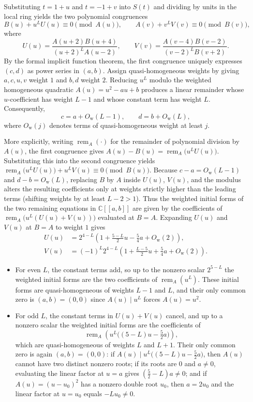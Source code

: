 \documentclass[11pt]{article}
\theoremstyle{definition}
\newcommand{\C}{\mathbb{C}}
\begin{document}
Substituting $t=1+u$ and $t=-1+v$ into $S(t)$ and dividing by units in the local ring yields the
two polynomial congruences
\[
 B(u)+u^L U(u)\equiv 0\pmod{A(u)},\qquad
 A(v)+v^L V(v)\equiv 0\pmod{B(v)},
\]
where
\[
 U(u)=\frac{A(u+2)B(u+4)}{(u+2)^L A(u-2)},\qquad
 V(v)=\frac{A(v-4)B(v-2)}{(v-2)^L B(v+2)}.
\]
By the formal implicit function theorem, the first congruence uniquely expresses $(c,d)$ as power series in $(a,b)$. Assign quasi-homogeneous weights by giving $a,c,u,v$ weight $1$ and $b,d$ weight $2$.
Reducing $u^L$ modulo the weighted homogeneous quadratic $A(u)=u^2-au+b$ produces a linear remainder whose $u$-coefficient has
weight $L-1$ and whose constant term has weight $L$. Consequently,
\[
 c=a+O_{\mathrm{w}}(L-1),\qquad d=b+O_{\mathrm{w}}(L),
\]
where $O_{\mathrm{w}}(j)$ denotes terms of quasi-homogeneous weight at least $j$.

More explicitly, writing $\operatorname{rem}_A(\cdot)$ for the remainder of polynomial division by $A(u)$, the first congruence gives
$A(u)-B(u)=\operatorname{rem}_A\bigl(u^L U(u)\bigr)$. Substituting this into the second congruence yields
$\operatorname{rem}_A\bigl(u^L U(u)\bigr)+u^L V(u)\equiv 0\pmod{B(u)}$. Because $c-a=O_{\mathrm{w}}(L-1)$ and $d-b=O_{\mathrm{w}}(L)$, replacing
$B$ by $A$ inside $U(u)$, $V(u)$, and the modulus alters the resulting coefficients only at weights strictly higher than the leading terms (shifting weights by at least $L-2>1$). Thus the weighted initial forms of the two remaining equations in $\C[[a,b]]$ are given by the coefficients of
$\operatorname{rem}_A\bigl(u^L(U(u)+V(u))\bigr)$ evaluated at $B=A$. Expanding $U(u)$ and $V(u)$ at $B=A$ to weight $1$ gives
\[
 \begin{aligned}
 U(u)&=2^{4-L}\left(1+\frac{5-L}{2}u-\frac{5}{4}a+O_{\mathrm{w}}(2)\right),\\
 V(u)&=(-1)^L 2^{4-L}\left(1+\frac{L-5}{2}u+\frac{5}{4}a+O_{\mathrm{w}}(2)\right).
 \end{aligned}
\]
\begin{itemize}
 \item For even $L$, the constant terms add, so up to the nonzero scalar $2^{5-L}$ the weighted initial forms are the two coefficients of
 $\operatorname{rem}_A(u^L)$. These initial forms are quasi-homogeneous of weights $L-1$ and $L$, and their only common zero is $(a,b)=(0,0)$ since $A(u)\mid u^L$ forces $A(u)=u^2$.
 \item For odd $L$, the constant terms in $U(u)+V(u)$ cancel, and up to a nonzero scalar the weighted initial forms are the coefficients of
 \[
  \operatorname{rem}_A\!\left(u^L\bigl((5-L)u-\tfrac{5}{2}a\bigr)\right),
 \]
 which are quasi-homogeneous of weights $L$ and $L+1$. Their only common zero is again $(a,b)=(0,0)$:
 if $A(u)\mid u^L\bigl((5-L)u-\frac{5}{2}a\bigr)$, then $A(u)$ cannot have two distinct nonzero roots; if its roots are $0$ and $a\ne 0$, evaluating the linear factor at $u=a$ gives $(\frac{5}{2}-L)a\ne 0$; and if $A(u)=(u-u_0)^2$ has a nonzero double root $u_0$, then $a=2u_0$ and the linear factor at $u=u_0$ equals $-Lu_0\ne 0$.
\end{itemize}
\end{document}
